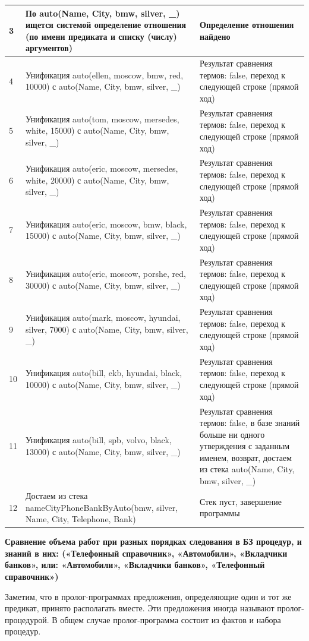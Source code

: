 \documentclass[a4paper,14pt]{extreport} %
\begin{document}
\begin{longtable}{|p{1.1cm}|p{8.5cm}|p{7cm}|}
	3 & По auto(Name, City, bmw, silver, \_) ищется системой определение отношения (по имени предиката и списку (числу) аргументов) & Определение отношения найдено \\ \hline
	4 & Унификация auto(ellen, moscow, bmw, red, 10000) с auto(Name, City, bmw, silver, \_) & Результат сравнения термов: false, переход к следующей строке (прямой ход) \\ \hline
	5 & Унификация auto(tom, moscow, mersedes, white, 15000) с auto(Name, City, bmw, silver, \_) & Результат сравнения термов: false, переход к следующей строке (прямой ход) \\ \hline
	6 & Унификация auto(eric, moscow, mersedes, white, 20000) с auto(Name, City, bmw, silver, \_) & Результат сравнения термов: false, переход к следующей строке (прямой ход) \\ \hline
	7 & Унификация auto(eric, moscow, bmw, black, 15000) с auto(Name, City, bmw, silver, \_) & Результат сравнения термов: false, переход к следующей строке (прямой ход) \\ \hline
	8 & Унификация auto(eric, moscow, porshe, red, 30000) с auto(Name, City, bmw, silver, \_) & Результат сравнения термов: false, переход к следующей строке (прямой ход) \\ \hline
	9 & Унификация auto(mark, moscow, hyundai, silver, 7000) с auto(Name, City, bmw, silver, \_) & Результат сравнения термов: false, переход к следующей строке (прямой ход) \\ \hline
	10 & Унификация auto(bill, ekb, hyundai, black, 10000) с auto(Name, City, bmw, silver, \_) & Результат сравнения термов: false, переход к следующей строке (прямой ход) \\ \hline
	11 & Унификация auto(bill, spb, volvo, black, 13000) с auto(Name, City, bmw, silver, \_) & Результат сравнения термов: false, в базе знаний больше ни одного утверждения с заданным именем, возврат, достаем из стека auto(Name, City, bmw, silver, \_) \\ \hline
	12 & Достаем из стека nameCityPhoneBankByAuto(bmw, silver, Name, City, Telephone, Bank) & Стек пуст, завершение программы \\ \hline
\end{longtable}

\textbf{Сравнение объема работ при разных порядках следования в БЗ  процедур, и знаний в них: («Телефонный справочник», «Автомобили», «Вкладчики банков», или: «Автомобили», «Вкладчики банков», «Телефонный справочник»)}

Заметим, что в пролог-программах предложения, определяющие один и тот же предикат, принято располагать вместе. Эти предложения иногда называют пролог-процедурой. В общем случае пролог-программа состоит из фактов и набора процедур.
\end{document}
